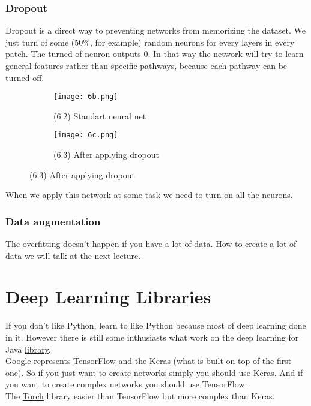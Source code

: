 \subsubsection*{Dropout}

Dropout is a direct way to preventing networks from memorizing the dataset. We just turn of some (50\%, for example) random neurons for every layers in every patch. The turned of neuron outputs 0. In that way the network will try to learn general features rather than specific pathways, because each pathway can be turned off.\\
\begin{figure}[h!]
  \centering
  \begin{subfigure}[l]{0.3\linewidth}
    \texttt{[image: 6b.png]}
    \caption*{(6.2) Standart neural net}
  \end{subfigure}
  \hspace{2cm}
  \begin{subfigure}[r]{0.3\linewidth}
    \texttt{[image: 6c.png]}
    \caption*{(6.3) After applying dropout}
  \end{subfigure}
\end{figure}
When we apply this network at some task we need to turn on all the neurons.

\subsubsection*{Data augmentation}

The overfitting doesn't happen if you have a lot of data. How to create a lot of data we will talk at the next lecture.

\section{Deep Learning Libraries}

If you don't like Python, learn to like Python because most of deep learning done in it. However there is still some inthusiasts what work on the deep learning for Java \href{http://deeplearning4j.org/}{library}.\\
Google represents \href{www.tensorflow.org}{TensorFlow} and the \href{keras.io}{Keras} (what is built on top of the first one). So if you just want to create networks simply you should use Keras. And if you want to create complex networks you should use TensorFlow.\\
The \href{torch.ch}{Torch} library easier than TensorFlow but more complex than Keras.